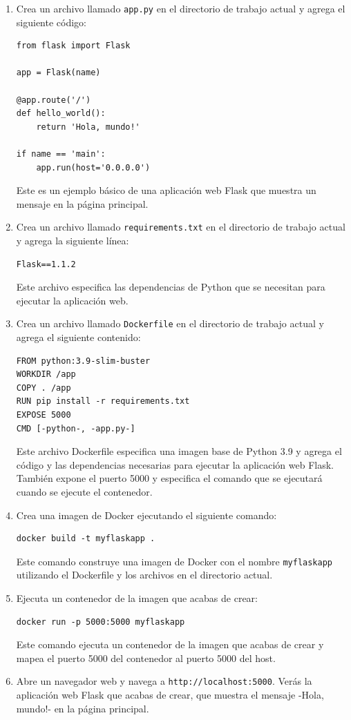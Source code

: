 \documentclass{article}
\begin{document}
\begin{enumerate}
\item Crea un archivo llamado \lstinline{app.py} en el directorio de trabajo actual y agrega el siguiente código:

\begin{lstlisting}[numbers=none]
from flask import Flask

app = Flask(name)

@app.route('/')
def hello_world():
    return 'Hola, mundo!'

if name == 'main':
    app.run(host='0.0.0.0')
\end{lstlisting}

Este es un ejemplo básico de una aplicación web Flask que muestra un mensaje en la página principal.
\item Crea un archivo llamado \lstinline{requirements.txt} en el directorio de trabajo actual y agrega la siguiente línea:
\begin{lstlisting}[numbers=none]
Flask==1.1.2
\end{lstlisting}

Este archivo especifica las dependencias de Python que se necesitan para ejecutar la aplicación web.
\item Crea un archivo llamado \lstinline{Dockerfile} en el directorio de trabajo actual y agrega el siguiente contenido:

\begin{lstlisting}[numbers=none]
FROM python:3.9-slim-buster
WORKDIR /app
COPY . /app
RUN pip install -r requirements.txt
EXPOSE 5000
CMD [-python-, -app.py-]
\end{lstlisting}

Este archivo Dockerfile especifica una imagen base de Python 3.9 y agrega el código y las dependencias necesarias para ejecutar la aplicación web Flask. También expone el puerto 5000 y especifica el comando que se ejecutará cuando se ejecute el contenedor.

\item Crea una imagen de Docker ejecutando el siguiente comando:
\begin{lstlisting}[numbers=none]
docker build -t myflaskapp .
\end{lstlisting}

Este comando construye una imagen de Docker con el nombre \lstinline{myflaskapp} utilizando el Dockerfile y los archivos en el directorio actual.
\item Ejecuta un contenedor de la imagen que acabas de crear:
\begin{lstlisting}[numbers=none]
docker run -p 5000:5000 myflaskapp
\end{lstlisting}

Este comando ejecuta un contenedor de la imagen que acabas de crear y mapea el puerto 5000 del contenedor al puerto 5000 del host.
\item Abre un navegador web y navega a \lstinline{http://localhost:5000}. Verás la aplicación web Flask que acabas de crear, que muestra el mensaje -Hola, mundo!- en la página principal.

\end{enumerate}
\end{document}
